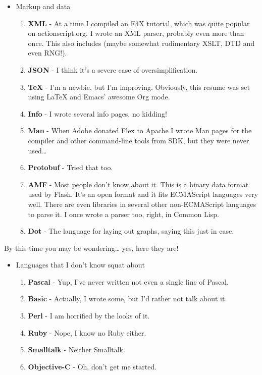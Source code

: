 \documentclass[oneside]{memoir}
\begin{document}
\begin{itemize}
\item Markup and data
\begin{enumerate}
\item \textbf{XML} - At a time I compiled an E4X tutorial, which was quite
popular on actionscript.org.  I wrote an XML parser, probably even more
than once.  This also includes (maybe somewhat rudimentary XSLT, DTD and
even RNG!).
\item \textbf{JSON} - I think it's a severe case of oversimplification.
\item \textbf{\TeX{}} - I'm a newbie, but I'm improving.  Obviously, this resume was set
using \LaTeX{} and Emacs' awesome Org mode.
\item \textbf{Info} - I wrote several info pages, no kidding!
\item \textbf{Man} - When Adobe donated Flex to Apache I wrote Man pages for the
compiler and other command-line tools from SDK, but they were never
used\ldots{}
\item \textbf{Protobuf} - Tried that too.
\item \textbf{AMF} - Most people don't know about it.  This is a binary data format
used by Flash.  It's an open format and it fits ECMAScript languages very
well.  There are even libraries in several other non-ECMAScript languages
to parse it.  I once wrote a parser too, right, in Common Lisp.
\item \textbf{Dot} - The language for laying out graphs, saying this just in case.
\end{enumerate}
\end{itemize}

By this time you may be wondering\ldots{} yes, here they are!

\begin{itemize}
\item Languages that I don't know squat about
\begin{enumerate}
\item \textbf{Pascal} - Yup, I've never written not even a single line of Pascal.
\item \textbf{Basic} - Actually, I wrote some, but I'd rather not talk about it.
\item \textbf{Perl} - I am horrified by the looks of it.
\item \textbf{Ruby} - Nope, I know no Ruby either.
\item \textbf{Smalltalk} - Neither Smalltalk.
\item \textbf{Objective-C} - Oh, don't get me started.
\end{enumerate}
\end{itemize}
\end{document}

